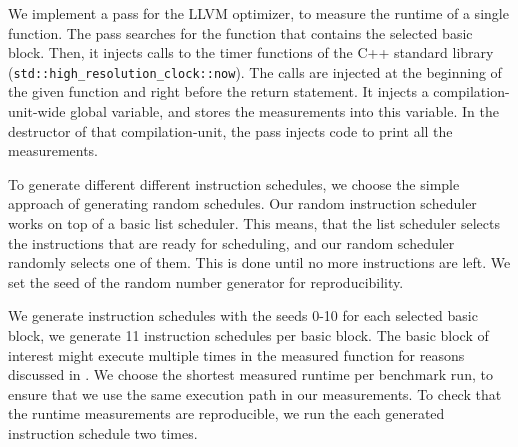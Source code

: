 We implement a pass for the LLVM optimizer, to measure the runtime of a single function.
The pass searches for the function that contains the selected basic block.
Then, it injects calls to the timer functions of the C++ standard library (\lstinline|std::high_resolution_clock::now|).
The calls are injected at the beginning of the given function and right before the return statement.
It injects a compilation-unit-wide global variable, and stores the measurements into this variable.
In the destructor of that compilation-unit, the pass injects code to print all the measurements.

To generate different different instruction schedules, we choose the simple approach of generating random schedules.
Our random instruction scheduler works on top of a basic list scheduler.
This means, that the list scheduler selects the instructions that are ready for scheduling, and our random scheduler randomly selects one of them.
This is done until no more instructions are left.
We set the seed of the random number generator for reproducibility.

We generate instruction schedules with the seeds 0-10 for each selected basic block, \ie we generate 11 instruction schedules per basic block.
The basic block of interest might execute multiple times in the measured function for reasons discussed in .
We choose the shortest measured runtime per benchmark run, to ensure that we use the same execution path in our measurements.
To check that the runtime measurements are reproducible, we run the each generated instruction schedule two times.

